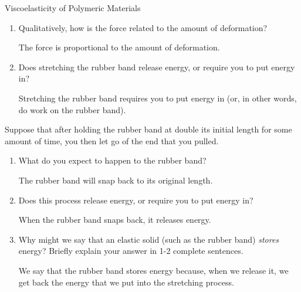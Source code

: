 \begin{activity}{Viscoelasticity of Polymeric Materials}
\begin{ctqs}
\begin{enumerate}
			\item Qualitatively, how is the force related to the amount of deformation?
			
				\begin{solution}[1.2in]
					The force is proportional to the amount of deformation.
				\end{solution}
			
			\item Does stretching the rubber band release energy, or require you to put energy in?
			
				\begin{solution}[1.2in]
					Stretching the rubber band requires you to put energy in (or, in other words, do work on the rubber band).
				\end{solution}
			
		\end{enumerate}
		
	\question Suppose that after holding the rubber band at double its initial length for some amount of time, you then let go of the end that you pulled.
	
		\begin{enumerate}
			
			\item What do you expect to happen to the rubber band?
			
				\begin{solution}[1in]
					The rubber band will snap back to its original length.
				\end{solution}
			
			\item Does this process release energy, or require you to put energy in?
			
				\begin{solution}[1in]
					When the rubber band snaps back, it releases energy.
				\end{solution}
			
			\item Why might we say that an elastic solid (such as the rubber band) \emph{stores} energy?  Briefly explain your answer in 1-2 complete sentences.
			
				\begin{solution}[2in]
					We say that the rubber band stores energy because, when we release it, we get back the energy that we put into the stretching process.
				\end{solution}
			
		\end{enumerate}
	

\end{ctqs}
\end{activity}
